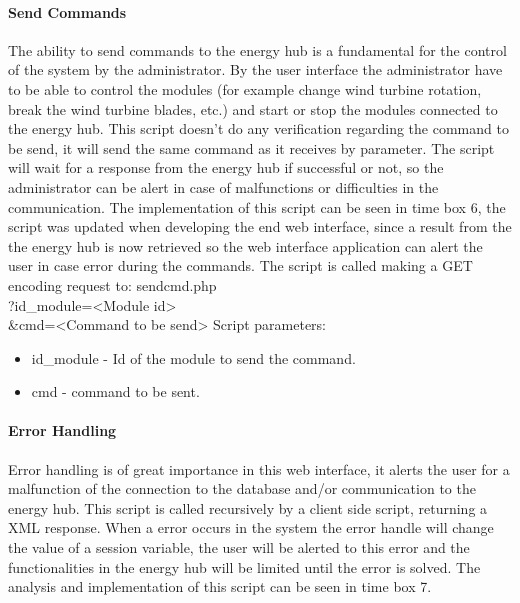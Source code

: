 \paragraph{Send Commands}
The ability to send commands to the energy hub is a fundamental for the control of the system by the administrator. By the user interface the administrator have to be able to control the modules (for example change wind turbine rotation, break the wind turbine blades, etc.) and start or stop the modules connected to the energy hub.
\p
This script doesn't do any verification regarding the command to be send, it will send the same command as it receives by parameter. The script will wait for a response from the energy hub if successful or not, so the administrator can be alert in case of malfunctions or difficulties in the communication.
\p
The implementation of this script can be seen in time box 6, the script was updated when developing the end web interface, since a result from the the energy hub is now retrieved so the web interface application can alert the user in case error during the commands.
\p
The script is called making a GET encoding request to:
\p
sendcmd.php \\
?id\_module=\textless Module id\textgreater \\
\&cmd=\textless Command to be send\textgreater
\p
Script parameters:
\begin{itemize}
	\item id\_module - Id of the module to send the command.
	\item cmd - command to be sent.
\end{itemize}
\paragraph{Error Handling}
Error handling is of great importance in this web interface, it alerts the user for a malfunction of the connection to the database and/or communication to the energy hub. This script is called recursively by a client side script, returning a XML response. When a error occurs in the system the error handle will change the value of a session variable, the user will be alerted to this error and the functionalities in the energy hub will be limited until the error is solved. The analysis and implementation of this script can be seen in time box 7.
